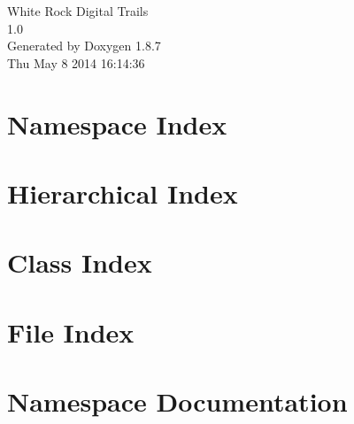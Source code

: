 \documentclass[twoside]{book}
\newcommand{\+}{\discretionary{\mbox{\scriptsize$\hookleftarrow$}}{}{}}
\newcommand{\clearemptydoublepage}{%
  \newpage{\pagestyle{empty}\cleardoublepage}%
}
\begin{document}
\hypersetup{pageanchor=false,
             bookmarks=true,
             bookmarksnumbered=true,
             pdfencoding=unicode
            }
\begin{titlepage}
\vspace*{7cm}
\begin{center}%
{\Large White Rock Digital Trails \\[1ex]\large 1.\+0 }\\
\vspace*{1cm}
{\large Generated by Doxygen 1.8.7}\\
\vspace*{0.5cm}
{\small Thu May 8 2014 16:14:36}\\
\end{center}
\end{titlepage}
\clearemptydoublepage
\tableofcontents
\clearemptydoublepage
{}
\hypersetup{pageanchor=true}

\chapter{Namespace Index}

\chapter{Hierarchical Index}

\chapter{Class Index}

\chapter{File Index}

\chapter{Namespace Documentation}











\end{document}
